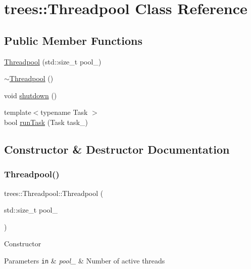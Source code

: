 \hypertarget{classtrees_1_1_threadpool}{}\section{trees\+:\+:Threadpool Class Reference}
\label{classtrees_1_1_threadpool}
\subsection*{Public Member Functions}
\begin{DoxyCompactItemize}
\item 
\hyperlink{classtrees_1_1_threadpool_a2ddeee4f43093bc52ff011213def07e4}{Threadpool} (std\+::size\+\_\+t pool\+\_\+)
\item 
\hyperlink{classtrees_1_1_threadpool_afb783a8a8b881f2f0be9cae58550d345}{$\sim$\+Threadpool} ()
\item 
void \hyperlink{classtrees_1_1_threadpool_a3d6488b730cc53472239f9c74e384d64}{shutdown} ()
\item 
{\footnotesize template$<$typename Task $>$ }\\bool \hyperlink{classtrees_1_1_threadpool_a5aa569f51cc6095e8017500c7e6b074d}{run\+Task} (Task task\+\_\+)
\end{DoxyCompactItemize}


\subsection{Constructor \& Destructor Documentation}
\mbox{\label{classtrees_1_1_threadpool_a2ddeee4f43093bc52ff011213def07e4}} 
\subsubsection{\texorpdfstring{Threadpool()}{Threadpool()}}
{\footnotesize\ttfamily trees\+::\+Threadpool\+::\+Threadpool (\begin{DoxyParamCaption}\item[{std\+::size\+\_\+t}]{pool\+\_\+ }\end{DoxyParamCaption})\hspace{0.3cm}{\ttfamily [inline]}}

Constructor


\begin{DoxyParams}[1]{Parameters}
\mbox{\tt in}  & {\em pool\+\_\+} & Number of active threads \\
\hline
\end{DoxyParams}
\mbox{\label{classtrees_1_1_threadpool_afb783a8a8b881f2f0be9cae58550d345}} 
